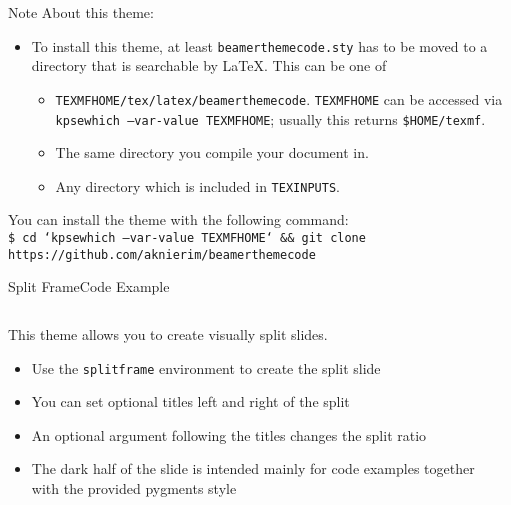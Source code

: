 \begin{frame}{Note}
  About this theme:
  \begin{itemize}
    \item To install this theme, at least \texttt{beamerthemecode.sty} has to be moved to a directory that is searchable by \LaTeX.
      This can be one of
      \begin{itemize}
        \item \texttt{TEXMFHOME/tex/latex/beamerthemecode}. \texttt{TEXMFHOME} can be accessed via \texttt{kpsewhich --var-value TEXMFHOME};
          usually this returns \texttt{\$HOME/texmf}.
        \item The same directory you compile your document in.
        \item Any directory which is included in \texttt{TEXINPUTS}.
      \end{itemize}
  \end{itemize}

  You can install the theme with the following command:\\
  \texttt{\footnotesize\$ cd `kpsewhich --var-value TEXMFHOME` \&\& git clone https://github.com/aknierim/beamerthemecode}
\end{frame}


\begin{splitframe}[fragile]{Split Frame}{Code Example}
  \begin{columns}[t]
    \begin{column}{0.58\textwidth}
      This theme allows you to create visually split slides.
      \begin{itemize}
        \setlength{\itemsep}{1em}
        \item Use the \texttt{splitframe} environment
          to create the split slide
        \item You can set optional titles left and right of the split
        \item An optional argument following the titles changes the split ratio
        \item The dark half of the slide is intended mainly for code
          examples together with the provided pygments style
      \end{itemize}
    \end{column}
    \hfill
    \begin{column}{0.38\textwidth}
      \footnotesize
      \color{cwhite}
      \inputminted{latex}{content/example_split_frame.tex}
    \end{column}
  \end{columns}
\end{splitframe}

